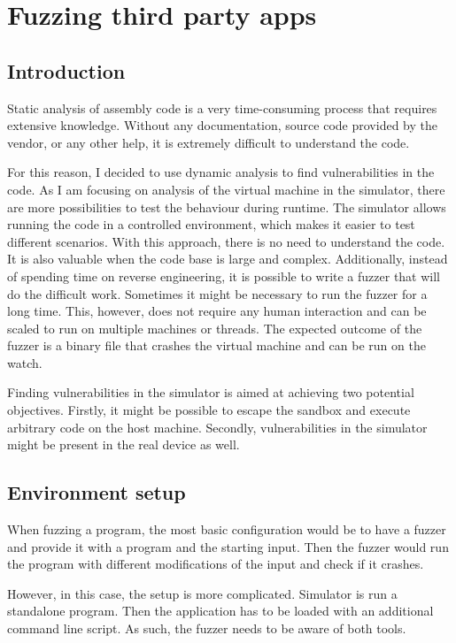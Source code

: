 \chapter{Fuzzing third party apps} \label{sec:fuzzing}
\section{Introduction}
Static analysis of assembly code is a very time-consuming process that requires extensive knowledge.
Without any documentation, source code provided by the vendor, or any other help, it is extremely difficult to understand the code.

For this reason, I decided to use dynamic analysis to find vulnerabilities in the code.
As I am focusing on analysis of the virtual machine in the simulator, there are more possibilities to test the behaviour during runtime.
The simulator allows running the code in a controlled environment, which makes it easier to test different scenarios.
With this approach, there is no need to understand the code.
It is also valuable when the code base is large and complex.
Additionally, instead of spending time on reverse engineering, it is possible to write a fuzzer that will do the difficult work.
Sometimes it might be necessary to run the fuzzer for a long time.
This, however, does not require any human interaction and can be scaled to run on multiple machines or threads.
The expected outcome of the fuzzer is a binary file that crashes the virtual machine and can be run on the watch.

Finding vulnerabilities in the simulator is aimed at achieving two potential objectives.
Firstly, it might be possible to escape the sandbox and execute arbitrary code on the host machine.
Secondly, vulnerabilities in the simulator might be present in the real device as well.

\section{Environment setup}
When fuzzing a program, the most basic configuration would be to have a fuzzer and provide it with a program and the starting input.
Then the fuzzer would run the program with different modifications of the input and check if it crashes.

However, in this case, the setup is more complicated.
Simulator is run a standalone program.
Then the application has to be loaded with an additional command line script.
As such, the fuzzer needs to be aware of both tools.

